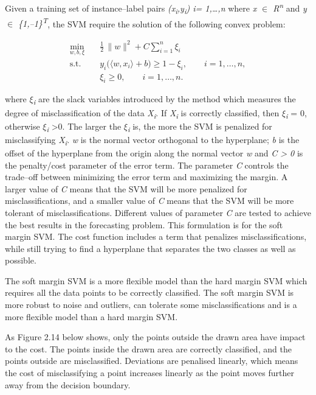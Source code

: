 \documentclass[12pt,a4paper]{report}
\numberwithin{equation}{section}
\begin{document}
Given a training set of instance--label pairs
\emph{(x\textsubscript{i},y\textsubscript{i}) i= 1,\ldots,n} where
\emph{x $\in$ R\textsuperscript{n}} and \emph{y $\in$
\{1,--1\}\textsuperscript{T}}, the SVM require the solution of the
following convex problem:

\begin{equation}
\begin{aligned}
\min_{w,b,\xi}\quad & \frac{1}{2}\,\lVert w\rVert^{2} + C\sum_{i=1}^{n}\xi_i \\
\text{s.t.}\quad
& y_i\bigl(\langle w,x_i\rangle + b\bigr) \ge 1-\xi_i,\qquad i=1,\ldots,n, \\
& \xi_i \ge 0,\qquad i=1,\ldots,n.
\end{aligned}
\label{eq:soft-margin-svm}
\end{equation}


where \emph{$\xi$\textsubscript{i}} are the slack variables introduced by
the method which measures the degree of misclassification of the data
\emph{X\textsubscript{i}}. If \emph{X\textsubscript{i}} is correctly
classified, then \emph{$\xi$\textsubscript{i}} = 0, otherwise
\emph{$\xi$\textsubscript{i}} \textgreater0. The larger the
\emph{$\xi$\textsubscript{i}} is, the more the SVM is penalized for
misclassifying \emph{X\textsubscript{i}}. \emph{w} is the normal vector
orthogonal to the hyperplane; \emph{b} is the offset of the hyperplane
from the origin along the normal vector \emph{w} and \emph{C
\textgreater{} 0} is the penalty/cost parameter of the error term. The
parameter \emph{C} controls the trade--off between minimizing the error
term and maximizing the margin. A larger value of \emph{C} means that
the SVM will be more penalized for misclassifications, and a smaller
value of \emph{C} means that the SVM will be more tolerant of
misclassifications. Different values of parameter \emph{C} are tested to
achieve the best results in the forecasting problem. This formulation is
for the soft margin SVM. The cost function includes a term that
penalizes misclassifications, while still trying to find a hyperplane
that separates the two classes as well as possible.

The soft margin SVM is a more flexible model than the hard margin SVM
which requires all the data points to be correctly classified. The soft
margin SVM is more robust to noise and outliers, can tolerate some
misclassifications and is a more flexible model than a hard margin SVM.

As Figure 2.14 below shows, only the points outside the drawn area have
impact to the cost. The points inside the drawn area are correctly
classified, and the points outside are misclassified. Deviations are
penalised linearly, which means the cost of misclassifying a point
increases linearly as the point moves further away from the decision
boundary.
\end{document}
